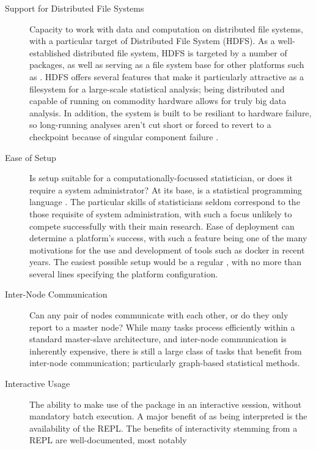 \begin{description}
  \item[Support for Distributed File Systems]
    Capacity to work with data and computation on distributed file systems,
    with a particular target of  Distributed File System (HDFS). As a
    well-established distributed file system, HDFS is targeted by a number
    of \R{} packages, as well as serving as a file system base for other
    platforms such as  \cite{analytics:_rhadoop_wiki}
    \cite{deltarho:_rhipe}\cite{urbanek20}\cite{zaharia2016apache}. HDFS offers
    several features that make it particularly attractive as a filesystem
    for a large-scale statistical analysis; being distributed and capable of
    running on commodity hardware allows for truly big data analysis. In
    addition, the system is built to be resiliant to hardware failure, so
    long-running analyses aren't cut short or forced to revert to a
    checkpoint because of singular component failure
    \cite{shvachko2010hadoop}.
  \item[Ease of Setup]
    Is setup suitable for a computationally-focussed statistician, or does
    it require a system administrator? At its base, \R{} is a statistical
    programming language \cite{rcore2020intro}. The particular skills of
    statisticians seldom correspond to the those requisite of system
    administration, with such a focus unlikely to compete successfully with
    their main research. Ease of deployment can determine a platform's
    success, with such a feature being one of the many motivations for the
    use and development of tools such as docker in recent years. The easiest
    possible setup would be a regular
    , with no more than
    several lines specifying the platform configuration.
  \item[Inter-Node Communication]
    Can any pair of nodes communicate with each other, or do they only
    report to a master node? While many tasks process efficiently within a
    standard master-slave architecture, and inter-node communication is
    inherently expensive, there is still a large class of tasks that benefit
    from inter-node communication\cite{walker1996mpi}; particularly
    graph-based statistical methods.
  \item[Interactive Usage]
    The ability to make use of the package in an interactive \R{} session,
    without mandatory batch execution. A major benefit of \R{} as being
    interpreted is the availability of the REPL. The benefits of
    interactivity stemming from a REPL are well-documented, most notably

\end{description}
